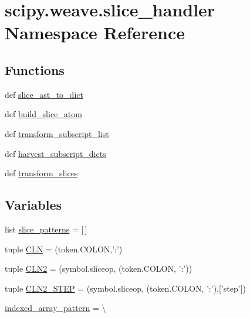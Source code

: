 \hypertarget{namespacescipy_1_1weave_1_1slice__handler}{}\section{scipy.\+weave.\+slice\+\_\+handler Namespace Reference}
\label{namespacescipy_1_1weave_1_1slice__handler}
\subsection*{Functions}
\begin{DoxyCompactItemize}
\item 
def \hyperlink{namespacescipy_1_1weave_1_1slice__handler_a93f0be94bbb50f22f5851029d085f0ae}{slice\+\_\+ast\+\_\+to\+\_\+dict}
\item 
def \hyperlink{namespacescipy_1_1weave_1_1slice__handler_ad0ec3b18ff57ac783923a45760a7b8c4}{build\+\_\+slice\+\_\+atom}
\item 
def \hyperlink{namespacescipy_1_1weave_1_1slice__handler_a4577c5532154d2f3846b03159b77c1e4}{transform\+\_\+subscript\+\_\+list}
\item 
def \hyperlink{namespacescipy_1_1weave_1_1slice__handler_a031f0c384e40e609ec82dc3f91d5e6b3}{harvest\+\_\+subscript\+\_\+dicts}
\item 
def \hyperlink{namespacescipy_1_1weave_1_1slice__handler_af2bfdfcb0937775de96c559eaea9c51d}{transform\+\_\+slices}
\end{DoxyCompactItemize}
\subsection*{Variables}
\begin{DoxyCompactItemize}
\item 
list \hyperlink{namespacescipy_1_1weave_1_1slice__handler_a01808abd851be0bbf6dbf61d2550741e}{slice\+\_\+patterns} = \mbox{[}$\,$\mbox{]}
\item 
tuple \hyperlink{namespacescipy_1_1weave_1_1slice__handler_a4f37d66feae244d96c5c37bc36d68766}{C\+L\+N} = (token.\+C\+O\+L\+O\+N,'\+:')
\item 
tuple \hyperlink{namespacescipy_1_1weave_1_1slice__handler_aaa95d513790819b4cc90c06592358e62}{C\+L\+N2} = (symbol.\+sliceop, (token.\+C\+O\+L\+O\+N, '\+:'))
\item 
tuple \hyperlink{namespacescipy_1_1weave_1_1slice__handler_ac117fe58686bf7f1b144a2fe58bc49cf}{C\+L\+N2\+\_\+\+S\+T\+E\+P} = (symbol.\+sliceop, (token.\+C\+O\+L\+O\+N, '\+:'),\mbox{[}'step'\mbox{]})
\item 
\hyperlink{namespacescipy_1_1weave_1_1slice__handler_a547b8d8a998065622b3f341f2b2a843c}{indexed\+\_\+array\+\_\+pattern} = \textbackslash{}
\end{DoxyCompactItemize}



